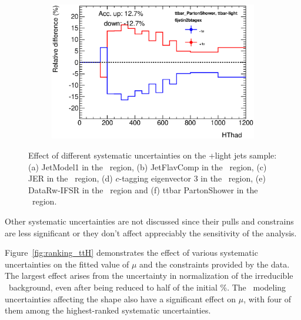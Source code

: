 \begin{figure}[tpb!]
\begin{subfigure}{0.47\textwidth}
     \caption{} \label{fig:control_IFSR}
  \end{subfigure}
  \begin{subfigure}{0.47\textwidth}
     \includegraphics[width=\textwidth]{Analysis/Figures_ttH/ControlPlots/6jetin2btagex_ttbar-light_ttbar_PartonShower.eps}
  \caption{} \label{fig:control_PS}
  \end{subfigure} 
  \caption{Effect of different systematic uncertainties on the \ttbar+light jets sample: 
 (a) JetModel1 in the \fourtwo\ region, (b) JetFlavComp in the \fourtwo\ region, (c) 
  JER in the \fourtwo\ region, (d) $c$-tagging eigenvector 3 in the \fourthree\ region, (e) 
  DataRw-IFSR in the \fourtwo\ region and (f) ttbar PartonShower in the \sixtwo\ region.
}
\end{figure}

Other systematic uncertainties are not discussed since their pulls and constrains are less significant or they don't affect appreciably the sensitivity of the analysis. 

Figure~\ref{fig:ranking_ttH} demonstrates the effect of various systematic uncertainties on
the fitted value of $\mu$ and the constraints provided by the data. 
The largest effect arises
from the uncertainty in normalization of the irreducible \ttbb\ 
background, even after being reduced to half of 
the initial \unit[50]{\%}.
The \ttbb\ modeling uncertainties affecting the 
shape also have a significant effect on $\mu$, with four of them
among the highest-ranked systematic uncertainties.

